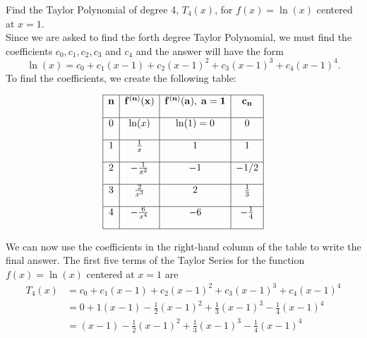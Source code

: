 \documentclass[handout]{ximera}
\begin{document}
\begin{example}[example 3] Find the Taylor Polynomial of degree 4, $T_4(x)$, for $f(x) = \ln(x)$ centered at $x = 1$.\\
Since we are asked to find the forth degree Taylor Polynomial, we must find the coefficients $c _0, c_1, c_2, c_3$ and $c_4$
and the answer will have the form 
\[
\ln(x) = c_0 + c_1(x-1) + c_2(x-1)^2 + c_3(x-1)^3 + c_4(x-1)^4.
\]
To find the coefficients, we create the following table:

\[
\begin{array}{|c|c|c|c|} 
\hline
\bf{n} & \bf{f^{(n)}(x)} & \bf{f^{(n)}(a), \; a = 1} & \bf{c_n} \\[1em] 
\hline
 0 & \ln(x) & \ln(1) = 0 & 0 \\[1em]
\hline
1 & \frac{1}{x} & 1 & 1 \\[1em]
\hline
 2 & -\frac{1}{x^2} & -1  & -1/2 \\[1em]
\hline
 3 & \frac{2}{x^3} & 2 & \frac13\\[1em]
\hline
 4 & -\frac{6}{x^4} & -6 & -\frac14\\[1em]
\hline
\end{array}
\]



We can now use the coefficients in the right-hand column of the table to write the final answer. 
The first five terms of the Taylor Series for the function $f(x) = \ln(x)$ centered at $x = 1$ are
\begin{align*}
T_4(x) &= c_0 + c_1(x-1) + c_2(x-1)^2 + c_3(x-1)^3 + c_4(x-1)^4\\
        &= 0 + 1(x-1) -\frac{1}{2}(x-1)^2 + \frac{1}{3}(x-1)^3-\frac{1}{4}(x-1)^4\\
        &= (x-1) -\frac{1}{2}(x-1)^2 + \frac{1}{3}(x-1)^3-\frac{1}{4}(x-1)^4
\end{align*}

\end{example}
\end{document}
